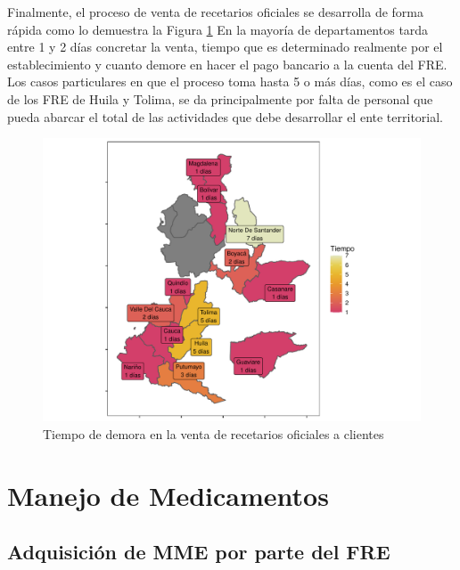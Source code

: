 \documentclass[
]{book}
\begin{document}
Finalmente, el proceso de venta de recetarios oficiales se desarrolla de forma rápida como lo demuestra la Figura \ref{fig:TiempoVentaInstituciones} En la mayoría de departamentos tarda entre 1 y 2 días concretar la venta, tiempo que es determinado realmente por el establecimiento y cuanto demore en hacer el pago bancario a la cuenta del FRE. Los casos particulares en que el proceso toma hasta 5 o más días, como es el caso de los FRE de Huila y Tolima, se da principalmente por falta de personal que pueda abarcar el total de las actividades que debe desarrollar el ente territorial.

\begin{figure}
\includegraphics[width=0.9\linewidth]{InformeFinal_files/figure-latex/TiempoVentaInstituciones-1} \caption{Tiempo de demora en la venta de recetarios oficiales a clientes}\label{fig:TiempoVentaInstituciones}
\end{figure}

\hypertarget{manejo-de-medicamentos}{%
\chapter{Manejo de Medicamentos}\label{manejo-de-medicamentos}}


\hypertarget{adquisiciuxf3n-de-mme-por-parte-del-fre}{%
\section{Adquisición de MME por parte del FRE}\label{adquisiciuxf3n-de-mme-por-parte-del-fre}}

\end{document}
